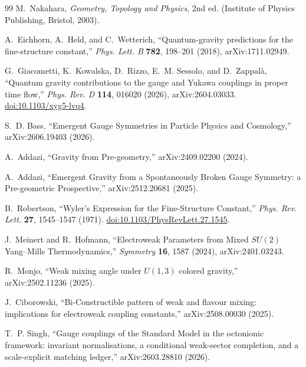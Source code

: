 \documentclass[10pt,twocolumn]{article}
\begin{document}
\begin{thebibliography}{99}
M.~Nakahara,
\emph{Geometry, Topology and Physics}, 2nd ed.
(Institute of Physics Publishing, Bristol, 2003).

A.~Eichhorn, A.~Held, and C.~Wetterich,
``Quantum-gravity predictions for the fine-structure constant,''
\emph{Phys. Lett. B} \textbf{782}, 198--201 (2018),
arXiv:1711.02949.

G.~Giacometti, K.~Kowalska, D.~Rizzo, E.~M. Sessolo, and D.~Zappal\`a,
``Quantum gravity contributions to the gauge and Yukawa couplings in proper time flow,''
\emph{Phys. Rev. D} \textbf{114}, 016020 (2026), arXiv:2604.03033.
\href{https://doi.org/10.1103/xyg5-lvq4}{doi:10.1103/xyg5-lvq4}.

S.~D. Bass,
``Emergent Gauge Symmetries in Particle Physics and Cosmology,''
arXiv:2606.19403 (2026).

A.~Addazi,
``Gravity from Pre-geometry,''
arXiv:2409.02200 (2024).

A.~Addazi,
``Emergent Gravity from a Spontaneously Broken Gauge Symmetry:
a Pre-geometric Prospective,''
arXiv:2512.20681 (2025).

B.~Robertson,
``Wyler's Expression for the Fine-Structure Constant,''
\emph{Phys. Rev. Lett.} \textbf{27}, 1545--1547 (1971).
\href{https://doi.org/10.1103/PhysRevLett.27.1545}{doi:10.1103/PhysRevLett.27.1545}.

J.~Meinert and R.~Hofmann,
``Electroweak Parameters from Mixed $SU(2)$ Yang--Mills Thermodynamics,''
\emph{Symmetry} \textbf{16}, 1587 (2024), arXiv:2401.03243.

R.~Monjo,
``Weak mixing angle under $U(1,3)$ colored gravity,''
arXiv:2502.11236 (2025).

J.~Ciborowski,
``Bi-Constructible pattern of weak and flavour mixing: implications for electroweak
coupling constants,''
arXiv:2508.00030 (2025).

T.~P. Singh,
``Gauge couplings of the Standard Model in the octonionic framework: invariant
normalisations, a conditional weak-sector completion, and a scale-explicit matching
ledger,''
arXiv:2603.28810 (2026).

\end{thebibliography}
\end{document}

